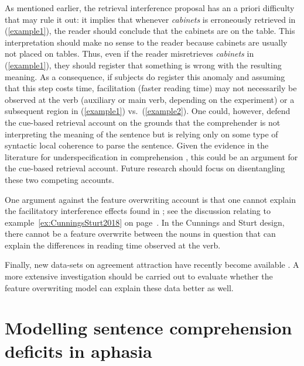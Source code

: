 \documentclass{cambridge7A}\usepackage[]{graphicx}\usepackage[]{color}
\begin{document}
As mentioned earlier, the retrieval interference proposal has an a priori difficulty that may rule it out: it implies that whenever \textit{cabinets} is erroneously retrieved in (\ref{example1}), the reader should conclude that the cabinets are on the table. This interpretation should make no sense to the reader because cabinets are usually not placed on tables.  Thus, even if the reader misretrieves \textit{cabinets} in (\ref{example1}), they should register that something is wrong with the resulting meaning. As a consequence, if subjects do register this anomaly and assuming that this step costs time, facilitation (faster reading time) may not necessarily be observed at the verb (auxiliary or main verb, depending on the experiment) or a subsequent region in (\ref{example1}) vs.\ (\ref{example2}). 
One could, however, defend the cue-based retrieval account on the grounds that the comprehender is not interpreting the meaning of the sentence but is relying only on some type of syntactic local coherence \cite{taboretal04} to parse the sentence. Given the evidence in the literature for underspecification in comprehension \citep{SwetsDesmetClifton2008,MalsburgVasishth2013}, this could be an argument for the cue-based retrieval account. Future research should focus on disentangling these two competing accounts.  

One argument against the feature overwriting account is that one cannot explain the facilitatory interference effects found in \cite{CunningsSturt2018}; see the discussion relating to example~\ref{ex:CunningsSturt2018} on page~\pageref{ex:CunningsSturt2018}. In the Cunnings and Sturt design, there cannot be a feature overwrite between the nouns in question that can explain the differences in reading time observed at the verb. 

Finally, new data-sets on agreement attraction have recently become available \citep{ALV2020,JaegerMertzenVanDykeVasishth2019}. A more extensive investigation should be carried out to evaluate whether the feature overwriting model can explain these data better as well.   





\chapter{Modelling sentence comprehension deficits in aphasia} \label{c06}
\end{document}
